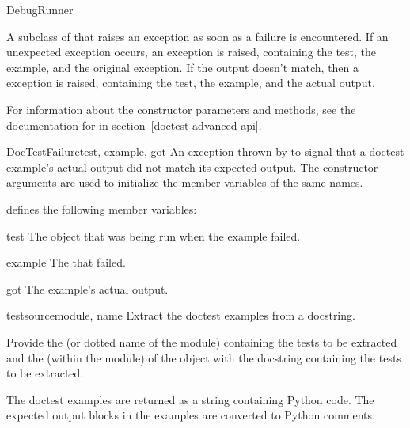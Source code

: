 \begin{classdesc}{DebugRunner}{}

    A subclass of  that raises an exception as
    soon as a failure is encountered.  If an unexpected exception
    occurs, an  exception is raised,
    containing the test, the example, and the original exception.  If
    the output doesn't match, then a 
    exception is raised, containing the test, the example, and the
    actual output.

    For information about the constructor parameters and methods, see
    the documentation for  in
    section~\ref{doctest-advanced-api}.
\end{classdesc}

\begin{excclassdesc}{DocTestFailure}{test, example, got}
    An exception thrown by  to signal that a
    doctest example's actual output did not match its expected output.
    The constructor arguments are used to initialize the member
    variables of the same names.
\end{excclassdesc}
 defines the following member variables:
\begin{memberdesc}{test}
    The  object that was being run when the example failed.
\end{memberdesc}
\begin{memberdesc}{example}
    The  that failed.
\end{memberdesc}
\begin{memberdesc}{got}
    The example's actual output.
\end{memberdesc}

\begin{funcdesc}{testsource}{module, name}
  Extract the doctest examples from a docstring.

  Provide the  (or dotted name of the module) containing the
  tests to be extracted and the  (within the module) of the object
  with the docstring containing the tests to be extracted.

  The doctest examples are returned as a string containing Python
  code.  The expected output blocks in the examples are converted
  to Python comments.
\end{funcdesc}

